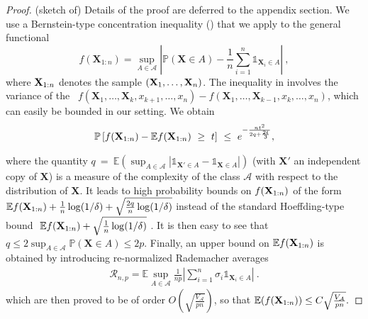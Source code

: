 \begin{proof} (sketch of)
Details of the proof are deferred to the appendix section.
We use a Bernstein-type concentration inequality (\cite{McDiarmid98}) that we  apply to 
the general  functional \[f(\mathbf{X}_{1:n})= \sup_{A \in \mathcal{A}} \left |
  \mathbb{P}(\mathbf{X} \in A) - \frac{1}{n} \sum_{i=1}^n
  \mathds{1}_{\mathbf{X}_i \in A} \right|~,\]
where $\mathbf X_{1:n}$ denotes the sample $(\mathbf X_1,\ldots,\mathbf X_n)$.
The inequality in \cite{McDiarmid98} %
involves
the variance of the
\rv~$f(\mathbf{X}_1,\ldots,\mathbf{X}_{k}, x_{k+1},\ldots, x_n) -
f(\mathbf{X}_1,\ldots,\mathbf{X}_{k-1},x_k,\ldots, x_n)$, which can
easily be bounded in our setting. %
We obtain %
\begin{align}
\label{colt:thm-princ:general}
\mathbb{P}\left [ f(\mathbf X_{1:n}) - \mathbb{E} f(\mathbf X_{1:n}) ~\ge~ t \right] ~\le~ e^{-\frac{n t^2}{2q + \frac{2t}{3}} },
\end{align}

\noindent
where the quantity $q~=~ \mathbb{E}\left ( \sup_{A \in \mathcal{A}}
  \left | \mathds{1}_{\mathbf{X}' \in A} - \mathds{1}_{\mathbf{X} \in
      A} \right|\right)$ (with  $\mathbf{X}'$ an independent copy of $\mathbf{X}$) is  a measure of the complexity of the class $\mathcal{A}$ with respect to the distribution of $\mathbf{X}$. 
It leads to high probability bounds on $f(\mathbf X_{1:n})$ of the form
$\mathbb{E}f(\mathbf X_{1:n}) + \frac{1}{n} \log (1/\delta) +
\sqrt{\frac{2q}{n} \log (1/\delta)} $ instead of the standard
Hoeffding-type bound  $~\mathbb{E}f(\mathbf X_{1:n}) + \sqrt{\frac{1}{n} \log (1/\delta)}$ .
It is then easy to see that $q \le 2\sup_{A \in \mathcal{A}} \mathbb{P}(\mathbf{X} \in A) \le 2p.$
Finally, an  upper bound on
$\mathbb E f(\mathbf X_{1:n})$ is obtained  by introducing re-normalized Rademacher averages 
\begin{align*}
\mathcal{R}_{n,p} = \mathbb{E} \sup_{A \in \mathcal{A}} \frac{1}{np} \left | \sum_{i=1}^{n} \sigma_i \mathds{1}_{\mathbf{\mathbf{X}}_i \in A}\right|~. 
\end{align*}
which are then proved to be of order $O (\sqrt{\frac{V_\mathcal{A} }{pn}})$, so that
$\mathbb{E}(f(\mathbf X_{1:n})) \le C\sqrt{\frac{V_\mathcal{A} }{pn}}.$
\end{proof}





